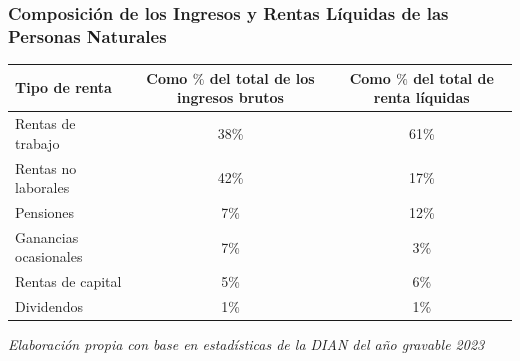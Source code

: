 \begin{frame}[fragile]
  \frametitle{Composición de los Ingresos y Rentas Líquidas de las Personas Naturales}

  \begin{table}
  \centering
  \scriptsize
  \begin{tabular}{lcc}
  \hline
\textbf{Tipo de renta} & \textbf{Como $\%$ del total de los ingresos brutos} & \textbf{Como $\%$ del total de renta líquidas} \\
  \hline
  Rentas de trabajo         & 38\% & 61\% \\
  Rentas no laborales       & 42\% & 17\% \\
  Pensiones                 & 7\%  & 12\% \\
  Ganancias ocasionales     & 7\%  & 3\%  \\
  Rentas de capital         & 5\%  & 6\%  \\
  Dividendos                & 1\%  & 1\%  \\
  \hline
  \end{tabular}
  \end{table}

  \vspace{0.2cm}
  \scriptsize\textit{Elaboración propia con base en estadísticas de la DIAN del año gravable 2023}

\end{frame}
